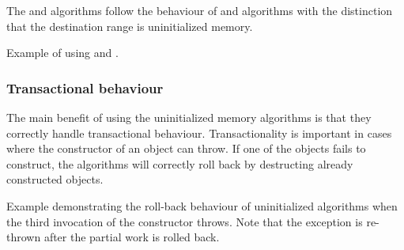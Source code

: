 The  and  algorithms follow the behaviour of  and  algorithms with the distinction that the destination range is uninitialized memory.



\begin{codebox}[]{\href{https://compiler-explorer.com/z/a9v4Tn46z}{\ExternalLink}}
\footnotesize Example of using  and .
\tcblower
{}
\end{codebox}

\subsubsection{Transactional behaviour}

The main benefit of using the uninitialized memory algorithms is that they correctly handle transactional behaviour. Transactionality is important in cases where the constructor of an object can throw. If one of the objects fails to construct, the algorithms will correctly roll back by destructing already constructed objects.

\begin{codebox}[breakable]{\href{https://compiler-explorer.com/z/6bP3P4ecK}{\ExternalLink}}
\footnotesize Example demonstrating the roll-back behaviour of uninitialized algorithms when the third invocation of the constructor throws. Note that the exception is re-thrown after the partial work is rolled back.
\tcblower
{}
\end{codebox}
